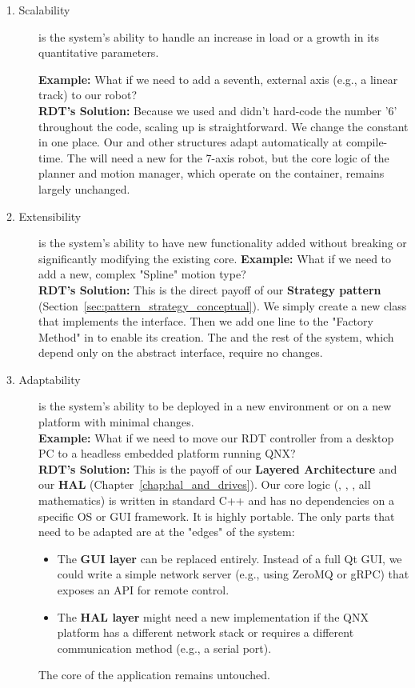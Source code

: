 \begin{description}
    \item[1. Scalability] is the system's ability to handle an increase in load or a growth in its quantitative parameters.

\textbf{Example:} What if we need to add a seventh, external axis (e.g., a linear track) to our robot?\\
\textbf{RDT's Solution:} Because we used  and didn't hard-code the number '6' throughout the code, scaling up is straightforward. We change the constant in one place. Our  and other structures adapt automatically at compile-time. The  will need a new  for the 7-axis robot, but the core logic of the planner and motion manager, which operate on the  container, remains largely unchanged.


    \item[2. Extensibility] is the system's ability to have new functionality added without breaking or significantly modifying the existing core.
\textbf{Example:} What if we need to add a new, complex "Spline" motion type?\\
\textbf{RDT's Solution:} This is the direct payoff of our \textbf{Strategy pattern} (Section~\ref{sec:pattern_strategy_conceptual}). We simply create a new  class that implements the  interface. Then we add one line to the "Factory Method" in  to enable its creation. The  and the rest of the system, which depend only on the abstract interface, require no changes.


\item[3. Adaptability] is the system's ability to be deployed in a new environment or on a new platform with minimal changes.\\
      \textbf{Example:} What if we need to move our RDT controller from a desktop PC to a headless embedded platform running QNX?\\
       \textbf{RDT's Solution:} This is the payoff of our \textbf{Layered Architecture} and our \textbf{HAL} (Chapter~\ref{chap:hal_and_drives}). Our core logic (, , , all mathematics) is written in standard C++ and has no dependencies on a specific OS or GUI framework. It is highly portable. The only parts that need to be adapted are at the "edges" of the system:
                \begin{itemize}
                    \item The \textbf{GUI layer} can be replaced entirely. Instead of a full Qt GUI, we could write a simple network server (e.g., using ZeroMQ or gRPC) that exposes an API for remote control.
                    \item The \textbf{HAL layer} might need a new  implementation if the QNX platform has a different network stack or requires a different communication method (e.g., a serial port).
                \end{itemize}
             The core of the application remains untouched.
\end{description}

